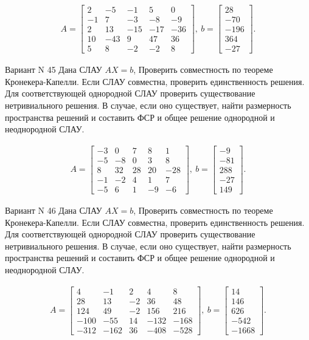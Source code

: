 \documentclass[11pt]{report}
\begin{document}
\begin{align*}
 A = \left[\begin{matrix}2 & -5 & -1 & 5 & 0\\-1 & 7 & -3 & -8 & -9\\2 & 13 & -15 & -17 & -36\\10 & -43 & 9 & 47 & 36\\5 & 8 & -2 & -2 & 8\end{matrix}\right],
\ b = \left[\begin{matrix}28\\-70\\-196\\364\\-27\end{matrix}\right]. 
 \end{align*}

Вариант N 45
Дана СЛАУ $AX = b$,
Проверить совместность по теореме Кронекера-Капелли. Если СЛАУ совместна, проверить единственность решения.
Для соответствующей однородной СЛАУ проверить существование нетривиального решения. В случае, если оно существует,
найти размерность пространства решений и составить ФСР и общее решение однородной  и неоднородной СЛАУ.


\begin{align*}
 A = \left[\begin{matrix}-3 & 0 & 7 & 8 & 1\\-5 & -8 & 0 & 3 & 8\\8 & 32 & 28 & 20 & -28\\-1 & -2 & 4 & 1 & 7\\-5 & 6 & 1 & -9 & -6\end{matrix}\right],
\ b = \left[\begin{matrix}-9\\-81\\288\\-27\\149\end{matrix}\right]. 
 \end{align*}

Вариант N 46
Дана СЛАУ $AX = b$,
Проверить совместность по теореме Кронекера-Капелли. Если СЛАУ совместна, проверить единственность решения.
Для соответствующей однородной СЛАУ проверить существование нетривиального решения. В случае, если оно существует,
найти размерность пространства решений и составить ФСР и общее решение однородной  и неоднородной СЛАУ.


\begin{align*}
 A = \left[\begin{matrix}4 & -1 & 2 & 4 & 8\\28 & 13 & -2 & 36 & 48\\124 & 49 & -2 & 156 & 216\\-100 & -55 & 14 & -132 & -168\\-312 & -162 & 36 & -408 & -528\end{matrix}\right],
\ b = \left[\begin{matrix}14\\146\\626\\-542\\-1668\end{matrix}\right]. 
 \end{align*}
\end{document}
